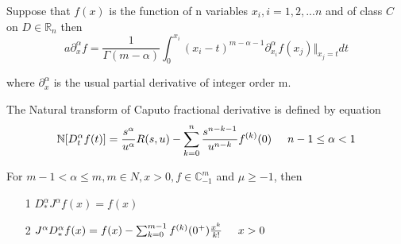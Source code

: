 \begin{definition}

Suppose that $f(x)$ is the function of n variables $x_{i},i=1,2,...n$ and of class $C$ on $D \in \mathbb{R}_{n}$ then
\begin{equation*}
a\partial^{\alpha}_{x}f=\frac{1}{\Gamma{(m-\alpha)}}\int_{0}^{x_{i}}(x_{i}-t)^{m-\alpha-1}\partial^{\alpha}_{x_{i}}f(x_{j})\Vert_{x_{j}=t}dt
\end{equation*}

where $ \partial^{\alpha}_{x} $ is the usual partial derivative of integer order m.

\end{definition}

\begin{definition}

The Natural transform of Caputo fractional derivative is defined by equation
\begin{equation*}
\mathbb{N}[D^{\alpha}_{t}f(t)]=\frac{s^{\alpha}}{u^{\alpha}}R(s,u)-\sum_{k=0}^{n}\frac{s^{n-k-1}}{u^{n-k}}f^{(k)}(0) \hspace{0.5cm} n-1\leq \alpha < 1
\end{equation*}

\end{definition}

\begin{lemma}
For $m-1 < \alpha \leq m,m\in N ,x > 0,f\in \mathbb{C}_{-1}^{m}$ and $ \mu \geq -1 $, then
\begin{itemize}
\item[1]$D^{\alpha}_{*}J^{\alpha}f(x)=f(x)$

\item[2]$J^{\alpha}D^{\alpha}_{*}f(x)=f(x)-\sum_{k=0}^{m-1}f^{(k)}(0^{+})
\frac{x^{k}}{k!}\hspace{0.5cm} x> 0$
\end{itemize}
\end{lemma}
